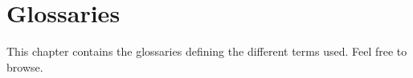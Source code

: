 \chapter{Glossaries}
This chapter contains the glossaries defining the different terms used. Feel
free to browse.

\printglossary[type=good]{}
\printglossary[type=biome]{}
